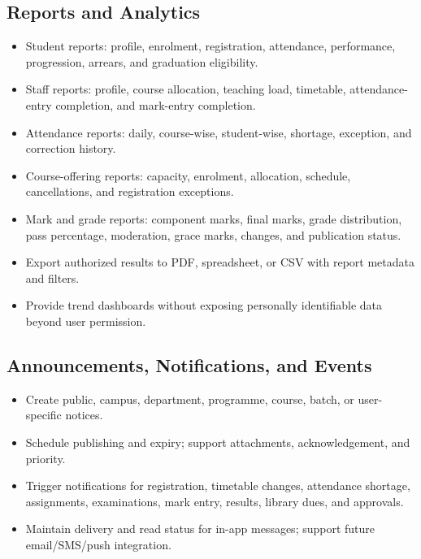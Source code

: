 \documentclass[10pt,a4paper]{article}
\begin{document}
\subsection{Reports and Analytics}
\begin{itemize}
  \item Student reports: profile, enrolment, registration, attendance, performance,
        progression, arrears, and graduation eligibility.
  \item Staff reports: profile, course allocation, teaching load, timetable,
        attendance-entry completion, and mark-entry completion.
  \item Attendance reports: daily, course-wise, student-wise, shortage,
        exception, and correction history.
  \item Course-offering reports: capacity, enrolment, allocation, schedule,
        cancellations, and registration exceptions.
  \item Mark and grade reports: component marks, final marks, grade distribution,
        pass percentage, moderation, grace marks, changes, and publication status.
  \item Export authorized results to PDF, spreadsheet, or CSV with report metadata and filters.
  \item Provide trend dashboards without exposing personally identifiable data beyond user permission.
\end{itemize}

\subsection{Announcements, Notifications, and Events}
\begin{itemize}
  \item Create public, campus, department, programme, course, batch, or user-specific notices.
  \item Schedule publishing and expiry; support attachments, acknowledgement, and priority.
  \item Trigger notifications for registration, timetable changes, attendance shortage,
        assignments, examinations, mark entry, results, library dues, and approvals.
  \item Maintain delivery and read status for in-app messages; support future email/SMS/push integration.
\end{itemize}
\end{document}

